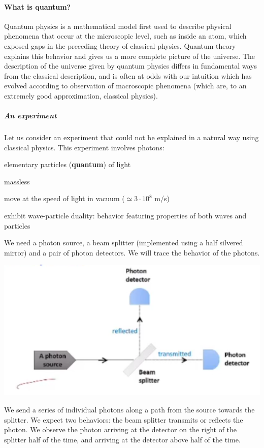 \documentclass[10pt]{report}
\begin{document}
\paragraph{What is quantum?} Quantum physics is a mathematical model first used to describe physical phenomena that occur at the microscopic level, such as inside an atom, which exposed gaps in the preceding theory of classical physics. Quantum theory explains this behavior and gives us a more complete picture of the universe. The description of the universe given by quantum physics differs in fundamental ways from the classical description, and is often at odds with our intuition which has evolved according to observation of macroscopic phenomena (which are, to an extremely good approximation, classical physics).
\subparagraph{An experiment} Let us consider an experiment that could not be explained in a natural way using classical physics. This experiment involves photons:\begin{list}{}{}
	\item elementary particles (\textbf{quantum}) of light
	\item massless
	\item move at the speed of light in vacuum ($\simeq 3\cdot10^8$ m/s)
	\item exhibit wave-particle duality: behavior featuring properties of both waves and particles
\end{list}
We need a photon source, a beam splitter (implemented using a half silvered mirror) and a pair of photon detectors. We will trace the behavior of the photons.
\begin{center}
	\includegraphics[scale=0.5]{1.png}
\end{center}
We send a series of individual photons along a path from the source towards the splitter. We expect two behaviors: the beam splitter transmits or reflects the photon. We observe the photon arriving at the detector on the right of the splitter half of the time, and arriving at the detector above half of the time.\\
\end{document}
